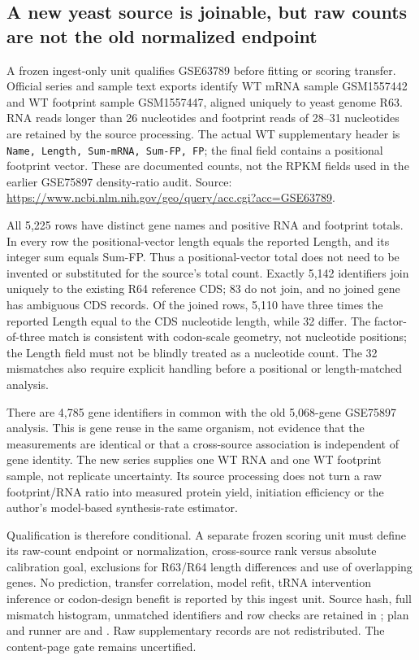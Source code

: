 \subsection{A new yeast source is joinable, but raw counts are not the old normalized endpoint}
A frozen ingest-only unit qualifies GSE63789 before fitting or scoring transfer. Official series and sample text exports identify WT mRNA sample GSM1557442 and WT footprint sample GSM1557447, aligned uniquely to yeast genome R63. RNA reads longer than 26 nucleotides and footprint reads of 28--31 nucleotides are retained by the source processing. The actual WT supplementary header is \texttt{Name, Length, Sum-mRNA, Sum-FP, FP}; the final field contains a positional footprint vector. These are documented counts, not the RPKM fields used in the earlier GSE75897 density-ratio audit. Source: \url{https://www.ncbi.nlm.nih.gov/geo/query/acc.cgi?acc=GSE63789}.

All 5,225 rows have distinct gene names and positive RNA and footprint totals. In every row the positional-vector length equals the reported Length, and its integer sum equals Sum-FP. Thus a positional-vector total does not need to be invented or substituted for the source's total count. Exactly 5,142 identifiers join uniquely to the existing R64 reference CDS; 83 do not join, and no joined gene has ambiguous CDS records. Of the joined rows, 5,110 have three times the reported Length equal to the CDS nucleotide length, while 32 differ. The factor-of-three match is consistent with codon-scale geometry, not nucleotide positions; the Length field must not be blindly treated as a nucleotide count. The 32 mismatches also require explicit handling before a positional or length-matched analysis.

There are 4,785 gene identifiers in common with the old 5,068-gene GSE75897 analysis. This is gene reuse in the same organism, not evidence that the measurements are identical or that a cross-source association is independent of gene identity. The new series supplies one WT RNA and one WT footprint sample, not replicate uncertainty. Its source processing does not turn a raw footprint/RNA ratio into measured protein yield, initiation efficiency or the author's model-based synthesis-rate estimator.

Qualification is therefore conditional. A separate frozen scoring unit must define its raw-count endpoint or normalization, cross-source rank versus absolute calibration goal, exclusions for R63/R64 length differences and use of overlapping genes. No prediction, transfer correlation, model refit, tRNA intervention inference or codon-design benefit is reported by this ingest unit. Source hash, full mismatch histogram, unmatched identifiers and row checks are retained in ; plan and runner are  and . Raw supplementary records are not redistributed. The content-page gate remains uncertified.
